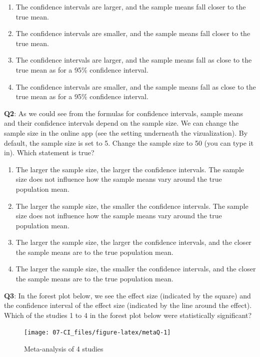 \documentclass[
  oneside]{book}
\providecommand{\tightlist}{%
  \setlength{\itemsep}{0pt}\setlength{\parskip}{0pt}}
\begin{document}
\begin{enumerate}
\def\labelenumi{\Alph{enumi})}
\tightlist
\item
  The confidence intervals are larger, and the sample means fall closer to the true mean.
\item
  The confidence intervals are smaller, and the sample means fall closer to the true mean.
\item
  The confidence intervals are larger, and the sample means fall as close to the true mean as for a 95\% confidence interval.
\item
  The confidence intervals are smaller, and the sample means fall as close to the true mean as for a 95\% confidence interval.
\end{enumerate}

\textbf{Q2}: As we could see from the formulas for confidence intervals, sample means and their confidence intervals depend on the sample size. We can change the sample size in the online app (see the setting underneath the vizualization). By default, the sample size is set to 5. Change the sample size to 50 (you can type it in). Which statement is true?

\begin{enumerate}
\def\labelenumi{\Alph{enumi})}
\tightlist
\item
  The larger the sample size, the larger the confidence intervals. The sample size does not influence how the sample means vary around the true population mean.
\item
  The larger the sample size, the smaller the confidence intervals. The sample size does not influence how the sample means vary around the true population mean.
\item
  The larger the sample size, the larger the confidence intervals, and the closer the sample means are to the true population mean.
\item
  The larger the sample size, the smaller the confidence intervals, and the closer the sample means are to the true population mean.
\end{enumerate}

\textbf{Q3}: In the forest plot below, we see the effect size (indicated by the square) and the confidence interval of the effect size (indicated by the line around the effect). Which of the studies 1 to 4 in the forest plot below were statistically significant?

\begin{figure}

{\centering \texttt{[image: 07-CI\_files/figure-latex/metaQ-1]} 

}

\caption{Meta-analysis of 4 studies}\label{fig:metaQ}
\end{figure}
\end{document}
